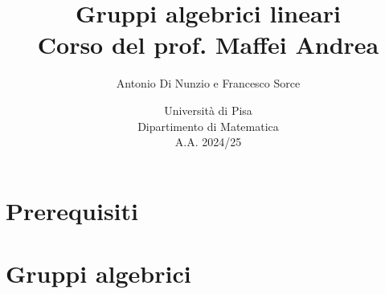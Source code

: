 \documentclass[a4paper]{report}
\title{Gruppi algebrici lineari\\
\large Corso del prof. Maffei Andrea}
\author{Antonio Di Nunzio
 e Francesco Sorce}
\date{Università di Pisa\\
Dipartimento di Matematica\\
A.A. 2024/25}
\begin{document}
\maketitle

\tableofcontents
\newpage


\part{Prerequisiti}


\part{Gruppi algebrici}



\end{document}
